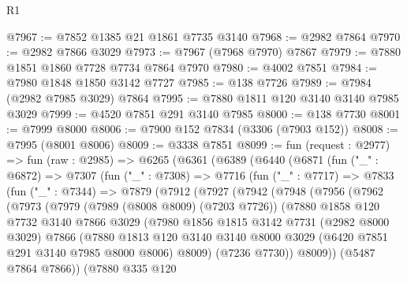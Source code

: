 \begin{lexlean}{R1}
\begin{coremodule}
@7967 := @7852 @1385 @21 @1861 @7735 @3140
@7968 := @2982 @7864
@7970 := @2982 @7866 @3029
@7973 := @7967 (@7968 @7970) @7867
@7979 := @7880 @1851 @1860 @7728 @7734 @7864 @7970
@7980 := @4002 @7851
@7984 := @7980 @1848 @1850 @3142 @7727
@7985 := @138 @7726
@7989 := @7984 (@2982 @7985 @3029) @7864
@7995 := @7880 @1811 @120 @3140 @3140 @7985 @3029
@7999 := @4520 @7851 @291 @3140 @7985
@8000 := @138 @7730
@8001 := @7999 @8000
@8006 := @7900 @152 @7834 (@3306 (@7903 @152))
@8008 := @7995 (@8001 @8006)
@8009 := @3338 @7851
@8099 := fun (request : @2977) =>
  fun (raw : @2985) =>
  @6265
    (@6361
      (@6389
        (@6440
          (@6871
            (fun ("_" : @6872) =>
            @7307
              (fun ("_" : @7308) =>
              @7716
                (fun ("_" : @7717) =>
                @7833
                  (fun ("_" : @7344) =>
                  @7879
                    (@7912
                      (@7927
                        (@7942
                          (@7948
                            (@7956
                              (@7962
                                (@7973
                                  (@7979
                                    (@7989 (@8008 @8009) (@7203 @7726))
                                    (@7880
                                      @1858
                                      @120
                                      @7732
                                      @3140
                                      @7866
                                      @3029
                                      (@7980
                                        @1856
                                        @1815
                                        @3142
                                        @7731
                                        (@2982 @8000 @3029)
                                        @7866
                                        (@7880
                                          @1813
                                          @120
                                          @3140
                                          @3140
                                          @8000
                                          @3029
                                          (@6420 @7851 @291 @3140 @7985 @8000 @8006)
                                          @8009)
                                        (@7236 @7730))
                                      @8009))
                                  (@5487 @7864 @7866))
                                (@7880
                                  @335
                                  @120

\end{coremodule}
\end{lexlean}
